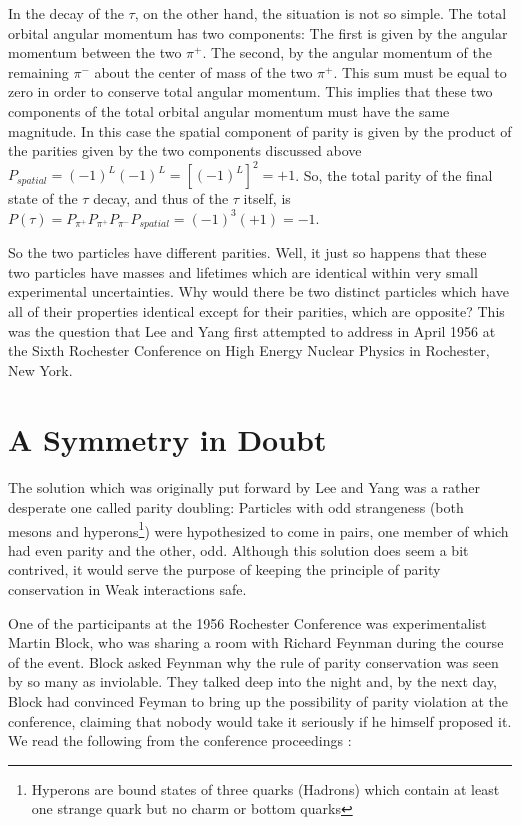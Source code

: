 \documentclass[a4paper,12pt]{book}
\begin{document}
In the decay of the $\tau$, on the other hand, the situation is not so simple. The total orbital angular momentum has two components: The first is given by the angular momentum between the two $\pi^{+}$. The second, by the angular momentum of the remaining $\pi^{-}$ about the center of mass of the two $\pi^{+}$. This sum must be equal to zero in order to conserve total angular momentum. This implies that these two components of the total orbital angular momentum must have the same magnitude. In this case the spatial component of parity is given by the product of the parities given by the two components discussed above $P_{spatial}=(-1)^{L}(-1)^{L}=[(-1)^{L}]^{2}=+1$. So, the total parity of the final state of the $\tau$ decay, and thus of the $\tau$ itself, is $P(\tau)=P_{\pi^{+}}P_{\pi^{+}}P_{\pi^{-}}P_{spatial}=(-1)^{3}(+1)=-1$.\cite{morii}

So the two particles have different parities. Well, it just so happens that these two particles have masses and lifetimes which are identical within very small experimental uncertainties. Why would there be two distinct particles which have all of their properties identical except for their parities, which are opposite? This was the question that Lee and Yang first attempted to address in April 1956 at the Sixth Rochester Conference on High Energy Nuclear Physics in Rochester, New York.

\section{A Symmetry in Doubt}

\paragraph*{}The solution which was originally put forward by Lee and Yang was a rather desperate one called parity doubling: Particles with odd strangeness (both mesons and hyperons\footnote{Hyperons are bound states of three quarks (Hadrons) which contain at least one strange quark but no charm or bottom quarks}) were hypothesized to come in pairs, one member of which had even parity and the other, odd. Although this solution does seem a bit contrived, it would serve the purpose of keeping the principle of parity conservation in Weak interactions safe.

One of the participants at the 1956 Rochester Conference was experimentalist Martin Block, who was sharing a room with Richard Feynman during the course of the event. Block asked Feynman why the rule of parity conservation was seen by so many as inviolable. They talked deep into the night and, by the next day, Block had convinced Feyman to bring up the possibility of parity violation at the conference, claiming that nobody would take it seriously if he himself proposed it. We read the following from the conference proceedings \cite{brandt}\cite{ballam}:
\end{document}
